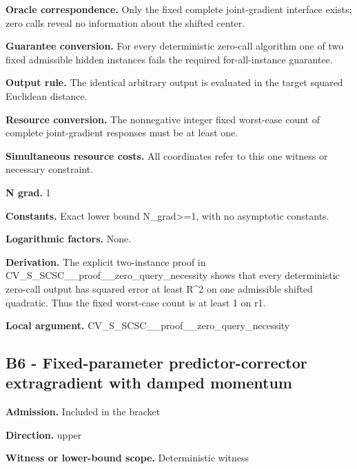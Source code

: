 \documentclass[10pt,a4paper]{article}
\begin{document}
\textbf{Oracle correspondence.} Only the fixed complete joint-gradient interface exists; zero calls reveal no information about the shifted center.



\textbf{Guarantee conversion.} For every deterministic zero-call algorithm one of two fixed admissible hidden instances fails the required for-all-instance guarantee.



\textbf{Output rule.} The identical arbitrary output is evaluated in the target squared Euclidean distance.



\textbf{Resource conversion.} The nonnegative integer fixed worst-case count of complete joint-gradient responses must be at least one.



\textbf{Simultaneous resource costs.} All coordinates refer to this one witness or necessary constraint.



\textbf{N grad.} 1



\textbf{Constants.} Exact lower bound N\_grad>=1, with no asymptotic constants.



\textbf{Logarithmic factors.} None.



\textbf{Derivation.} The explicit two-instance proof in CV\_S\_SCSC\_\_proof\_\_zero\_query\_necessity shows that every deterministic zero-call output has squared error at least R\textasciicircum{}2 on one admissible shifted quadratic. Thus the fixed worst-case count is at least 1 on r1.



\textbf{Local argument.} CV\_S\_SCSC\_\_proof\_\_zero\_query\_necessity



\subsection{B6 - Fixed-parameter predictor-corrector extragradient with damped momentum}


\textbf{Admission.} Included in the bracket



\textbf{Direction.} upper



\textbf{Witness or lower-bound scope.} Deterministic witness
\end{document}
